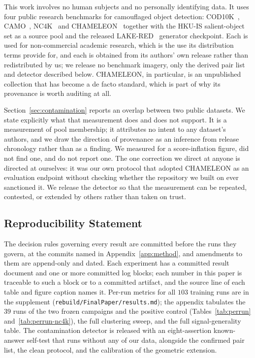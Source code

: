 \documentclass{article}
\begin{document}
This work involves no human subjects and no personally identifying data. It uses four public
research benchmarks for camouflaged object detection: COD10K~\citep{fan2022concealed},
CAMO~\citep{le2019anabranch}, NC4K~\citep{lv2021simultaneously} and
CHAMELEON~\citep{skurowski2018animal} together with the HKU-IS salient-object set as a source
pool and the released LAKE-RED~\citep{zhao2024lakered} generator checkpoint. Each is used for
non-commercial academic research, which is the use its distribution terms provide for, and each is
obtained from its authors' own release rather than redistributed by us; we release no benchmark
imagery, only the derived pair list and detector described below. CHAMELEON, in particular, is an unpublished collection that has become a de facto standard, which is part of why its provenance is worth auditing at all.

Section~\ref{sec:contamination} reports an overlap between two public datasets. We state explicitly
what that measurement does and does not support. It is a measurement of pool membership; it attributes
no intent to any dataset's authors, and we draw the direction of provenance as an inference from
release chronology rather than as a finding. We measured for a score-inflation figure, did not find
one, and do not report one. The one correction we direct at anyone is directed at ourselves: it was
our own protocol that adopted CHAMELEON as an evaluation endpoint without checking whether the
repository we built on ever sanctioned it. We release the detector so that the measurement can be
repeated, contested, or extended by others rather than taken on trust.

\subsection*{Reproducibility Statement}

The decision rules governing every result are committed before the runs they govern, at the commits
named in Appendix~\ref{app:method}, and amendments to them are append-only and dated. Each experiment
has a committed result document and one or more committed log blocks; each number in this paper is
traceable to such a block or to a committed artifact, and the source line of each table and figure
caption names it. Per-run metrics for all $103$ training runs are in the supplement
(\texttt{rebuild/FinalPaper/results.md}); the appendix tabulates the $39$ runs of the two frozen
campaigns and the positive control (Tables~\ref{tab:perrun} and~\ref{tab:perrun-nc4k}), the full
clustering sweep, and the full signal-generality table. The contamination detector is released with an
eight-assertion known-answer self-test that runs without any of our data, alongside the confirmed
pair list, the clean protocol, and the calibration of the geometric extension.
\end{document}

